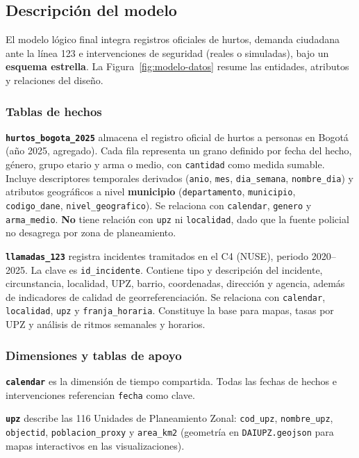 \documentclass[12pt,letterpaper]{article}
\begin{document}
\subsection{Descripción del modelo}

El modelo lógico final integra registros oficiales de hurtos, demanda ciudadana ante la línea 123 e intervenciones de seguridad (reales o simuladas), bajo un \textbf{esquema estrella}. La Figura~\ref{fig:modelo-datos} resume las entidades, atributos y relaciones del diseño.

\subsubsection{Tablas de hechos}

\textbf{\texttt{hurtos\_bogota\_2025}} almacena el registro oficial de hurtos a personas en Bogotá (año 2025, agregado). Cada fila representa un grano definido por fecha del hecho, género, grupo etario y arma o medio, con \texttt{cantidad} como medida sumable. Incluye descriptores temporales derivados (\texttt{anio}, \texttt{mes}, \texttt{dia\_semana}, \texttt{nombre\_dia}) y atributos geográficos a nivel \textbf{municipio} (\texttt{departamento}, \texttt{municipio}, \texttt{codigo\_dane}, \texttt{nivel\_geografico}). Se relaciona con \texttt{calendar}, \texttt{genero} y \texttt{arma\_medio}. \textbf{No} tiene relación con \texttt{upz} ni \texttt{localidad}, dado que la fuente policial no desagrega por zona de planeamiento.

\textbf{\texttt{llamadas\_123}} registra incidentes tramitados en el C4 (NUSE), periodo 2020--2025. La clave es \texttt{id\_incidente}. Contiene tipo y descripción del incidente, circunstancia, localidad, UPZ, barrio, coordenadas, dirección y agencia, además de indicadores de calidad de georreferenciación. Se relaciona con \texttt{calendar}, \texttt{localidad}, \texttt{upz} y \texttt{franja\_horaria}. Constituye la base para mapas, tasas por UPZ y análisis de ritmos semanales y horarios.

\subsubsection{Dimensiones y tablas de apoyo}

\textbf{\texttt{calendar}} es la dimensión de tiempo compartida. Todas las fechas de hechos e intervenciones referencian \texttt{fecha} como clave.

\textbf{\texttt{upz}} describe las 116 Unidades de Planeamiento Zonal: \texttt{cod\_upz}, \texttt{nombre\_upz}, \texttt{objectid}, \texttt{poblacion\_proxy} y \texttt{area\_km2} (geometría en \texttt{DAIUPZ.geojson} para mapas interactivos en las visualizaciones).
\end{document}
